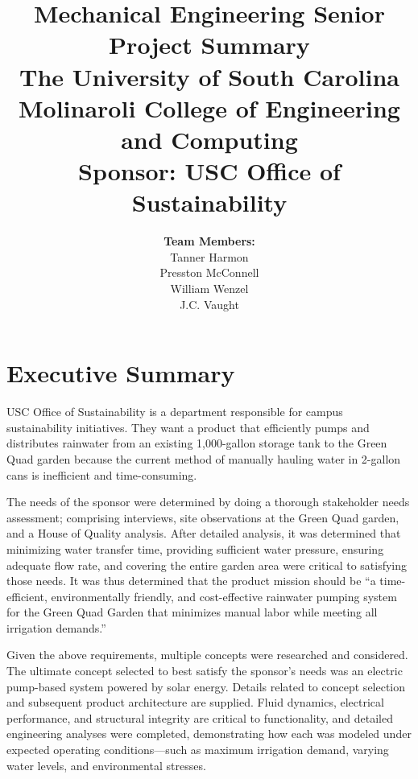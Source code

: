 \documentclass[12pt]{report}
\begin{document}
\title{
    \vspace{0in}
    \textbf{Mechanical Engineering Senior Project Summary} \\[1ex]
    The University of South Carolina \\[1ex]
    Molinaroli College of Engineering and Computing \\[1ex]
    \textbf{Sponsor: USC Office of Sustainability} \\[1ex]
    \vspace{2in}
}

\author{
    \textbf{Team Members:} \\[2ex]
    Tanner Harmon \\[1ex]
    Presston McConnell \\[1ex]
    William Wenzel \\[1ex]
    J.C. Vaught  \\[2ex]
}
\date{}
\maketitle


\tableofcontents
\listoffigures
\listoftables


\chapter*{Executive Summary}

USC Office of Sustainability is a department responsible for campus sustainability initiatives. They want a product that efficiently pumps and distributes rainwater from an existing 1,000-gallon storage tank to the Green Quad garden because the current method of manually hauling water in 2-gallon cans is inefficient and time-consuming.

The needs of the sponsor were determined by doing a thorough stakeholder needs assessment; comprising interviews, site observations at the Green Quad garden, and a House of Quality analysis. After detailed analysis, it was determined that minimizing water transfer time, providing sufficient water pressure, ensuring adequate flow rate, and covering the entire garden area were critical to satisfying those needs. It was thus determined that the product mission should be “a time-efficient, environmentally friendly, and cost-effective rainwater pumping system for the Green Quad Garden that minimizes manual labor while meeting all irrigation demands.”

Given the above requirements, multiple concepts were researched and considered. The ultimate concept selected to best satisfy the sponsor's needs was an electric pump-based system powered by solar energy. Details related to concept selection and subsequent product architecture are supplied. Fluid dynamics, electrical performance, and structural integrity are critical to functionality, and detailed engineering analyses were completed, demonstrating how each was modeled under expected operating conditions—such as maximum irrigation demand, varying water levels, and environmental stresses.
\end{document}

